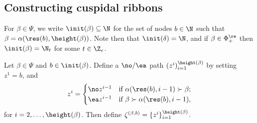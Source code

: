  
 \subsection{Constructing cuspidal ribbons}\label{cuspcons}
For \(\beta \in \Psi\), we write \(\init(\beta) \subseteq \N\) for the set of nodes \(b \in \N\) such that \(\beta = \alpha(\res(b), \height(\beta))\). Note then that \(\init(\delta) = \N\), and if \(\beta \in \Phi_+^\re\) then \(\init(\beta) = \N_t\) for some \(t \in \Z_e\).
 

\begin{defi}\label{defxib}
Let \(\beta \in \Psi\) and \(b \in \init(\beta)\). Define a \(\no/\ea\) path \((z^i)_{i=1}^{\height(\beta)}\) by setting \(z^1 = b\), and 
\begin{align*}
z^i = \begin{cases}
\no z^{i-1} & \textup{if } \alpha(\res(b), i-1) \succ \beta;\\
\ea z^{i-1} & \textup{if } \beta \succ \alpha(\res(b), i-1),\\
\end{cases}
\end{align*}
for \(i = 2, \ldots, \height(\beta)\). Then define \(\zeta^{(\beta, b)} = \{z^i\}_{i=1}^{\height(\beta)}\).
\end{defi}

